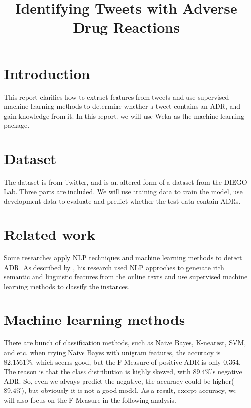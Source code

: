 \documentclass[11pt]{article}
\title{Identifying Tweets with Adverse Drug Reactions}
\begin{document}
\maketitle



\section{Introduction}
This report clarifies how to extract features from tweets and
use supervised machine learning methods to determine
whether a tweet contains an ADR\footnotemark, and gain knowledge from it.
In this report, we will use Weka\cite{Hall:2009:WDM:1656274.1656278}
as the machine learning package.

\section{Dataset}
The dataset is from Twitter,
and is an altered form of a dataset from the DIEGO Lab\cite{SARKER2015196}.
Three parts are included.
We will use training data to train the model,
use development data to evaluate
and predict whether the test data contain ADRs.

\section{Related work}
Some researches apply NLP techniques
and machine learning methods to detect ADR.
As described by ,
his research used NLP approches to generate rich semantic
and linguistic features from the online texts
and use supervised machine learning methods to classify the instances.

\section{Machine learning methods}
There are bunch of classification methods, such as Naive Bayes, K-nearest, SVM,
and etc.
when trying Naive Bayes with unigram features,
the accuracy is $82.1561\%$, which seems good,
but the F-Measure of positive ADR is only $0.364$.
The reason is that the class distribution is highly skewed,
with $89.4\%$'s negative ADR.
So, even we always predict the negative,
the accuracy could be higher($89.4\%$), but obviously it is not a good model.
As a result, except accuracy,
we will also focus on the F-Measure in the following analysis.
\end{document}
